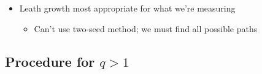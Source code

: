 \documentclass{umthesis}          %
\begin{document}
\begin{itemize}
\begin{itemize}
\end{itemize} %

\item Leath growth most appropriate for what we're measuring\\
\label{sec-4.2.2.3}

\begin{itemize}

\item Can't use two-seed method; we must find all possible paths\\
\label{sec-4.2.2.3.1}

\end{itemize} %
\end{itemize} %
\subsection{Procedure for $q>1$}
\label{sec-4.2.3}
\end{document}

